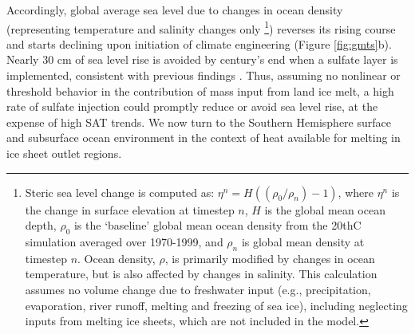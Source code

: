 \documentclass[grl]{AGUTeX}  %
\begin{document}
\begin{article}
Accordingly, global average sea level due to changes in ocean density (representing temperature and salinity changes only \footnote{Steric sea level change is computed as: $\eta^n = H((\rho_0 / \rho_n) -1)$, where $\eta^n$ is the change in surface elevation at timestep $n$, $H$ is the global mean ocean depth, $\rho_0$ is the `baseline' global mean ocean density from the 20thC simulation averaged over 1970-1999, and $\rho_n$ is global mean density at timestep $n$. Ocean density, $\rho$, is primarily modified by changes in ocean temperature, but is also affected by changes in salinity. This calculation assumes no volume change due to freshwater input (e.g., precipitation, evaporation, river runoff, melting and freezing of sea ice), including neglecting inputs from melting ice sheets, which are not included in the model.}) reverses its rising course and starts declining upon initiation of climate engineering (Figure \ref{fig:gmts}b). Nearly 30 cm of sea level rise is avoided by century's end when a sulfate layer is implemented, consistent with previous findings \citep{irvine12}. Thus, assuming no nonlinear or threshold behavior in the contribution of mass input from land ice melt, a high rate of sulfate injection could promptly reduce or avoid sea level rise, at the expense of high SAT trends. We now turn to the Southern Hemisphere surface and subsurface ocean environment in the context of heat available for melting in ice sheet outlet regions. %


\end{article}
\end{document}
